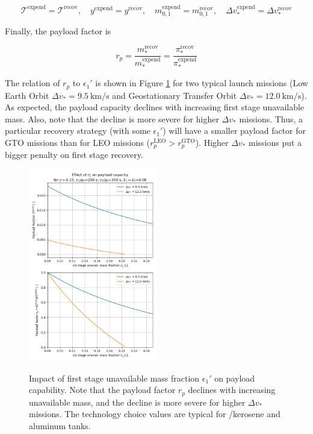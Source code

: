 \documentclass[conf]{new-aiaa}
\begin{document}
\begin{equation}
\mathcal{T}^{\mathrm{expend}} = \mathcal{T}^{\mathrm{recov}}, \quad y^{\mathrm{expend}} = y^{\mathrm{recov}}, \quad m_{0,1}^{\mathrm{expend}} = m_{0,1}^{\mathrm{recov}}, \quad \Delta v_*^{\mathrm{expend}} = \Delta v_*^{\mathrm{recov}}
\end{equation}

Finally, the payload factor is

\begin{equation}
r_p = \frac{m_*^{\mathrm{recov}}}{m_*^{\mathrm{expend}}} = \frac{\pi_*^{\mathrm{recov}}}{\pi_*^{\mathrm{expend}}}
\end{equation}

The relation of $r_p$ to $\epsilon_1'$ is shown in Figure \ref{fig:payload} for two typical launch missions (Low Earth Orbit $\Delta v_* = \SI{9.5}{\kilo\meter\per\second}$ and Geostationary Transfer Orbit $\Delta v_* = \SI{12.0}{\kilo\meter\per\second}$). As expected, the payload capacity declines with increasing first stage unavailable mass. Also, note that the decline is more severe for higher $\Delta v_*$ missions. Thus, a particular recovery strategy (with some $\epsilon_1'$) will have a smaller payload factor for GTO missions than for LEO missions ($r_p^{\mathrm{LEO}} > r_p^\mathrm{GTO}$). Higher $\Delta v_*$ missions put a bigger penalty on first stage recovery. 

\begin{figure}[hbt!]
	\centering
	\includegraphics[width=0.5\textwidth]{../payload}
	\label{fig:payload}
	\caption{Impact of first stage unavailable mass fraction $\epsilon_1'$ on payload capability. Note that the payload factor $r_p$ declines with increasing unavailable mass, and the decline is more severe for higher $\Delta v_*$ missions. The technology choice values are typical for /kerosene and aluminum tanks.}
\end{figure}
\end{document}
